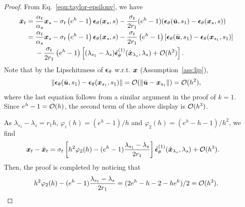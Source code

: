 \begin{proof}
From Eq.~\eqref{eqn:taylor-epsilonv}, we have
\[
\begin{aligned}
\bar \x_{t} &= 
    \frac{\alpha_t}{\alpha_s} \x_s 
       - \sigma_{t} \left ( e^{h} - 1\right ) \epsilonv_\theta(\x_s, s) 
     - \frac{\sigma_t}{2r_1} (e^{h} - 1) (\epsilonv_\theta(\bar \uv, s_1) - \epsilonv_\theta(\x_s, s))  \\
    &= 
    \frac{\alpha_t}{\alpha_s} \x_s 
       - \sigma_{t} \left ( e^{h} - 1\right ) \epsilonv_\theta(\x_s, s) 
          -   \frac{\sigma_t}{2r_1}  \left ( e^{h} - 1\right )  \left [ 
       \epsilonv_\theta(\bar \uv, s_1) 
       - \epsilonv_\theta(\x_{s_1}, s_1) 
      \right ] \\
     &\phantom{{}={}} - \frac{\sigma_{t}}{2r_1} \left ( e^{h} - 1\right ) 
      \left [ (\lambda_{s_1} - \lambda_s)\hat\epsilonv_\theta^{(1)}(\hat\x_{\lambda_s},\lambda_s)
       + \Oc(h^2)
      \right ].
\end{aligned}
\]
Note that by the Lipschitzness of $\bm{\epsilon}_\theta$ w.r.t. $\bm{x}$ (Assumption~\ref{ass:lip}),
\[
       \| \bm{\epsilon}_\theta(\bar {\bm{u}}, s_1) 
       - \bm{\epsilon}_\theta(\bm{x}_{s_1}, s_1)  \|
       =
       \mathcal O(\| \bar {\bm{u}} - \bm{x}_{s_1} \|) = \mathcal O(h^2),
\]
where the last equation follows from a similar argument in the proof of $k=1$. Since $e^h - 1 = \mathcal O(h)$, the second term of the above display is $\mathcal O(h^3)$.

As $\lambda_{s_1} - \lambda_s = r_1h$, $\varphi_i(h) = (e^h - 1) / h$ and $\varphi_2(h) =  (e^h - h - 1) / h^2$, we find
\[
\begin{aligned}
\bm{x}_t - \bar {\bm{x}}_t
&= \sigma_t \left [ h^2 \varphi_2(h) - (e^h - 1)\frac{ \lambda_{s_1} - \lambda_s}{2r_1} \right ] \hat{\bm{\epsilon}}_\theta^{(1)} (\hat {\bm{x}}_{\lambda_s}, \lambda_s)
+ \mathcal O(h^3).
\end{aligned}
\]
Then, the proof is completed by noticing that 
\[ h^2\varphi_2(h) - (e^h - 1) \frac{\lambda_{s_1} - \lambda_s}{2r_1} = (2e^h - h - 2 - he^h) / 2 = \mathcal O(h^3). \]
\end{proof}


